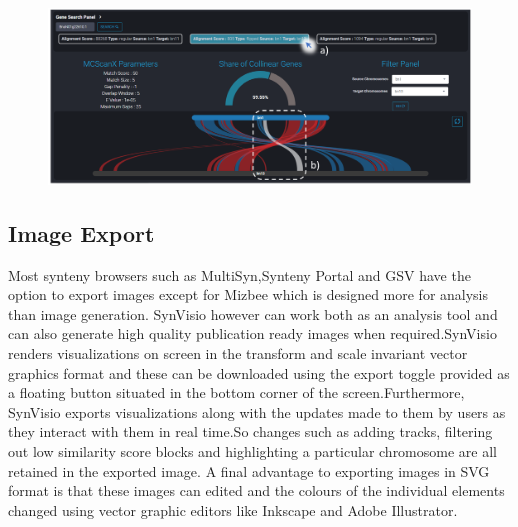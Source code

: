 \begin{figure}
  \centering
  \includegraphics[width=1\linewidth]{images/ch_5_gene_serach.PNG}
  \label{fig:ch_5_gene_serach}
\end{figure}


\subsection{Image Export}
Most synteny browsers such as MultiSyn,Synteny Portal and GSV\cite{baek2016multisyn,lee2016synteny,revanna2011gsv} have the option to export images  except for Mizbee\cite{Meyer2009} which is designed more for analysis than image generation.
SynVisio however can work both as an analysis tool and can also generate high quality publication ready images when required.SynVisio renders visualizations on screen in the transform and scale invariant vector graphics format and these can be downloaded using the export toggle provided as a floating button situated in the bottom corner of the screen.Furthermore, SynVisio exports visualizations along with the updates made to them by users as they interact with them in real time.So changes such as adding tracks, filtering out low similarity score blocks and highlighting a particular chromosome are all retained in the exported image. A final advantage to exporting images in SVG format is that these images can edited and the colours of the individual elements changed using vector graphic editors like Inkscape and Adobe Illustrator.

